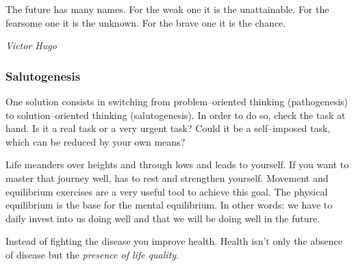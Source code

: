 \documentclass[../Book.Stress_regulation.tex]{subfiles}
\begin{document}
\epigraph{The future has many names. For the weak one it is the unattainable. For the fearsome one it is the unknown. For the brave one it is the chance.}{\textit{Victor Hugo}}

\subsubsection{Salutogenesis}
One solution consists in switching from problem--oriented thinking (pathogenesis) to {solution--oriented thinking} (salutogenesis). In order to do so, check the task at hand.
Is it a {real} task or a very {urgent task}? Could it be a {self--imposed task}, which can be reduced by your own means?

Life meanders over heights and through lows and leads to yourself. If you want to master that journey well, has to rest and strengthen yourself. Movement and equilibrium exercises are a very useful tool to achieve this goal. The physical equilibrium is the base for the mental equilibrium.
In other words: we have to daily invest into us doing well and that we will be doing well in the future.

Instead of fighting the disease you {improve health}. Health isn't only the absence of disease but the \emph{presence of life quality}.


\newpage
{}
\newpage
\end{document}
